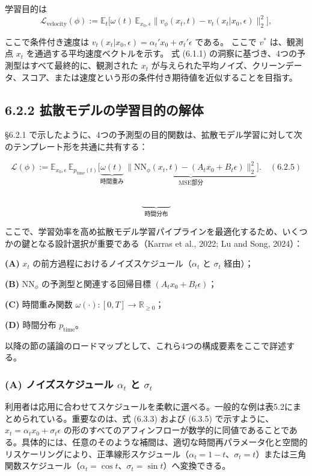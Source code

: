 学習目的は
\[
\mathcal{L}_{\mathrm{velocity}}(\phi) := \mathbb{E}_t\bigl[\omega(t)\,\mathbb{E}_{x_0,\epsilon}\|v_\phi(x_t, t) - v_t(x_t|x_0,\epsilon)\|_2^2\bigr],
\]

ここで条件付き速度は $v_t(x_t|x_0,\epsilon) = \alpha_t' x_0 + \sigma_t' \epsilon$ である。
ここで $v^*$ は、観測点 $x_t$ を通過する平均速度ベクトルを示す。
式 (6.1.1) の洞察に基づき、4つの予測型はすべて最終的に、観測された $x_t$ が与えられた平均ノイズ、クリーンデータ、スコア、または速度という形の条件付き期待値を近似することを目指す。

\subsection*{6.2.2 拡散モデルの学習目的の解体}


§6.2.1 で示したように、4つの予測型の目的関数は、拡散モデル学習に対して次のテンプレート形を共通に共有する：

\[
\mathcal{L}(\phi) := \mathbb{E}_{x_0,\epsilon}\,\mathbb{E}_{p_{\mathrm{time}}(t)}\Biggl[\underbrace{\omega(t)}_{\text{時間重み}}\,\underbrace{\bigl\|\mathrm{NN}_\phi(x_t, t) - (A_t x_0 + B_t\epsilon)\bigr\|_2^2}_{\text{MSE部分}}\Biggr]. \quad (6.2.5)
\]

\[
\underbrace{\phantom{\mathbb{E}_{p_{\mathrm{time}}(t)}}}_{\text{時間分布}}
\]


ここで、学習効率を高め拡散モデル学習パイプラインを最適化するため、いくつかの鍵となる設計選択が重要である（Karras et al., 2022; Lu and Song, 2024）：

\textbf{(A)} $x_t$ の前方過程におけるノイズスケジュール（$\alpha_t$ と $\sigma_t$ 経由）；

\textbf{(B)} $\mathrm{NN}_\phi$ の予測型と関連する回帰目標 $(A_t x_0 + B_t\epsilon)$；

\textbf{(C)} 時間重み関数 $\omega(\cdot): [0,T] \to \mathbb{R}_{\ge 0}$；

\textbf{(D)} 時間分布 $p_{\mathrm{time}}$。

以降の節の議論のロードマップとして、これら4つの構成要素をここで詳述する。

\subsubsection*{(A) ノイズスケジュール $\alpha_t$ と $\sigma_t$}


利用者は応用に合わせてスケジュールを柔軟に選べる。一般的な例は表5.2にまとめられている。重要なのは、式 (6.3.3) および (6.3.5) で示すように、$x_t = \alpha_t x_0 + \sigma_t\epsilon$ の形のすべてのアフィンフローが数学的に同値であることである。具体的には、任意のそのような補間は、適切な時間再パラメータ化と空間的リスケーリングにより、正準線形スケジュール（$\alpha_t = 1-t$、$\sigma_t = t$）または三角関数スケジュール（$\alpha_t = \cos t$、$\sigma_t = \sin t$）へ変換できる。

